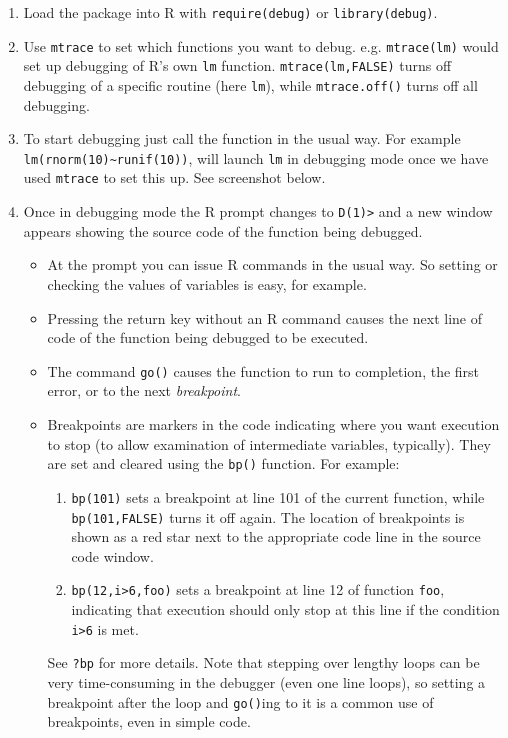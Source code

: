 \documentclass[10pt] {article}
\theoremstyle{definition}
\begin{document}
\begin{enumerate}
\item Load the package into R with \lstinline+require(debug)+ or \lstinline+library(debug)+.
\item Use \lstinline+mtrace+ to set which functions you want to debug. e.g. \lstinline+mtrace(lm)+ would set up debugging of R's own {\tt lm} function. \lstinline+mtrace(lm,FALSE)+ turns off debugging of a specific routine (here \lstinline+lm+), while \lstinline+mtrace.off()+ turns off all debugging.
\item To start debugging just call the function in the usual way. For example \lstinline+lm(rnorm(10)~runif(10))+, will launch \lstinline+lm+ in debugging mode once we have used \lstinline+mtrace+ to set this up. See screenshot below.
\item Once in debugging mode the R prompt changes to \verb+D(1)>+ and a new window appears showing the source code of the function being debugged. 
\begin{itemize}
\item At the prompt you can issue R commands in the usual way. So setting or checking the values of variables is easy, for example.
\item Pressing the return key without an R command causes the next line of code of the function being debugged to be executed.
\item The command \lstinline+go()+ causes the function to run to completion, the first error, or to the next {\em breakpoint}.
\item Breakpoints are markers in the code indicating where you want execution to stop (to allow examination of intermediate variables, typically). They are set and cleared using the \lstinline+bp()+ function. For example:
\begin{enumerate}
\item \lstinline+bp(101)+ sets a breakpoint at line 101 of the current function, while \lstinline+bp(101,FALSE)+ turns it off again. The location of breakpoints is shown as a red star next to the appropriate code line in the source code window.
\item \lstinline+bp(12,i>6,foo)+ sets a breakpoint at line 12 of function {\tt foo}, indicating that execution should only stop at this line if the condition \verb+i>6+ is met.  
\end{enumerate}
See {\tt ?bp} for more details. Note that stepping over lengthy loops can be very time-consuming in the debugger (even one line loops), so setting a breakpoint after the loop and \lstinline+go()+ing to it is a common use of breakpoints, even in simple code. 

\end{itemize}
\end{enumerate}
\end{document}
